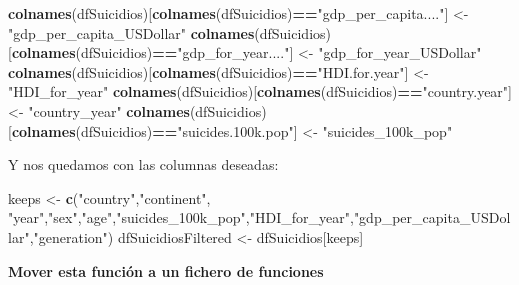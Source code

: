\documentclass[]{article}
\newenvironment{Shaded}{\begin{snugshade}}{\end{snugshade}}
\newcommand{\KeywordTok}[1]{\textcolor[rgb]{0.13,0.29,0.53}{\textbf{#1}}}
\newcommand{\NormalTok}[1]{#1}
\newcommand{\OperatorTok}[1]{\textcolor[rgb]{0.81,0.36,0.00}{\textbf{#1}}}
\newcommand{\StringTok}[1]{\textcolor[rgb]{0.31,0.60,0.02}{#1}}
\begin{document}
\begin{Shaded}
\begin{Highlighting}[]
\KeywordTok{colnames}\NormalTok{(dfSuicidios)[}\KeywordTok{colnames}\NormalTok{(dfSuicidios)}\OperatorTok{==}\StringTok{"gdp_per_capita...."}\NormalTok{] <-}\StringTok{ "gdp_per_capita_USDollar"}
\KeywordTok{colnames}\NormalTok{(dfSuicidios)[}\KeywordTok{colnames}\NormalTok{(dfSuicidios)}\OperatorTok{==}\StringTok{"gdp_for_year...."}\NormalTok{] <-}\StringTok{ "gdp_for_year_USDollar"}
\KeywordTok{colnames}\NormalTok{(dfSuicidios)[}\KeywordTok{colnames}\NormalTok{(dfSuicidios)}\OperatorTok{==}\StringTok{"HDI.for.year"}\NormalTok{] <-}\StringTok{ "HDI_for_year"}
\KeywordTok{colnames}\NormalTok{(dfSuicidios)[}\KeywordTok{colnames}\NormalTok{(dfSuicidios)}\OperatorTok{==}\StringTok{"country.year"}\NormalTok{] <-}\StringTok{ "country_year"}
\KeywordTok{colnames}\NormalTok{(dfSuicidios)[}\KeywordTok{colnames}\NormalTok{(dfSuicidios)}\OperatorTok{==}\StringTok{"suicides.100k.pop"}\NormalTok{] <-}\StringTok{ "suicides_100k_pop"}
\end{Highlighting}
\end{Shaded}

Y nos quedamos con las columnas deseadas:

\begin{Shaded}
\begin{Highlighting}[]
\NormalTok{keeps <-}\StringTok{ }\KeywordTok{c}\NormalTok{(}\StringTok{"country"}\NormalTok{,}\StringTok{"continent"}\NormalTok{, }\StringTok{"year"}\NormalTok{,}\StringTok{"sex"}\NormalTok{,}\StringTok{"age"}\NormalTok{,}\StringTok{"suicides_100k_pop"}\NormalTok{,}\StringTok{"HDI_for_year"}\NormalTok{,}\StringTok{"gdp_per_capita_USDollar"}\NormalTok{,}\StringTok{"generation"}\NormalTok{)}
\NormalTok{dfSuicidiosFiltered <-}\StringTok{ }\NormalTok{dfSuicidios[keeps]}
\end{Highlighting}
\end{Shaded}

\textbf{Mover esta función a un fichero de funciones}
\end{document}
